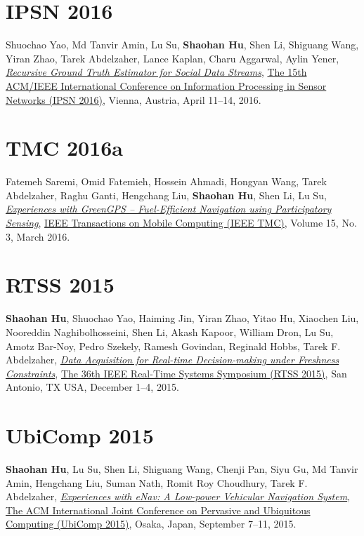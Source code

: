 \section{\sc IPSN 2016}\hypertarget{yao2016ipsn}{}
Shuochao Yao, Md Tanvir Amin, Lu Su, \textbf{Shaohan Hu}, Shen Li, Shiguang Wang, Yiran Zhao, Tarek Abdelzaher, Lance Kaplan, Charu Aggarwal, Aylin Yener,
\href{http://ieeexplore.ieee.org/stamp/stamp.jsp?tp=&arnumber=7460719}{\emph{Recursive Ground Truth Estimator for Social Data Streams}},
\href{http://ipsn.acm.org/2016/}{\textsf{The 15th ACM/IEEE International Conference on Information Processing in Sensor Networks (IPSN 2016)}},
Vienna, Austria, April 11--14, 2016.

\section{\sc TMC 2016a}\hypertarget{saremi2016tmc}{}
Fatemeh Saremi, Omid Fatemieh, Hossein Ahmadi, Hongyan Wang, Tarek Abdelzaher, Raghu Ganti, Hengchang Liu, \textbf{Shaohan Hu}, Shen Li, Lu Su,
\href{http://ieeexplore.ieee.org/xpl/articleDetails.jsp?tp=&arnumber=7084108}{\emph{Experiences with GreenGPS -- Fuel-Efficient Navigation using Participatory Sensing}},
\href{http://www.computer.org/web/tmc}{\textsf{IEEE Transactions on Mobile Computing (IEEE TMC)}},
Volume 15, No. 3, March 2016.

\section{\sc RTSS 2015}\hypertarget{hu2015rtss}{}
\textbf{Shaohan Hu}, Shuochao Yao, Haiming Jin, Yiran Zhao, Yitao Hu, Xiaochen Liu, Nooreddin Naghibolhosseini, Shen Li, Akash Kapoor, William Dron, Lu Su, Amotz Bar-Noy, Pedro Szekely, Ramesh Govindan, Reginald Hobbs, Tarek F. Abdelzaher,
\href{http://ieeexplore.ieee.org/xpl/articleDetails.jsp?arnumber=7383576}{\emph{Data Acquisition for Real-time Decision-making under Freshness Constraints}},
\href{http://2015.rtss.org/}{\textsf{The 36th IEEE Real-Time Systems Symposium (RTSS 2015)}},
San Antonio, TX USA, December 1--4, 2015.

\section{\sc UbiComp 2015}\hypertarget{hu2015ubicomp}{}
\textbf{Shaohan Hu}, Lu Su, Shen Li, Shiguang Wang, Chenji Pan, Siyu Gu, Md Tanvir Amin, Hengchang Liu, Suman Nath, Romit Roy Choudhury, Tarek F. Abdelzaher,
\href{http://dl.acm.org/citation.cfm?id=2804287}{\emph{Experiences with eNav: A Low-power Vehicular Navigation System}},
\href{http://ubicomp.org/ubicomp2015/}{\textsf{The ACM International Joint Conference on Pervasive and Ubiquitous Computing (UbiComp 2015)}},
Osaka, Japan, September 7--11, 2015.

